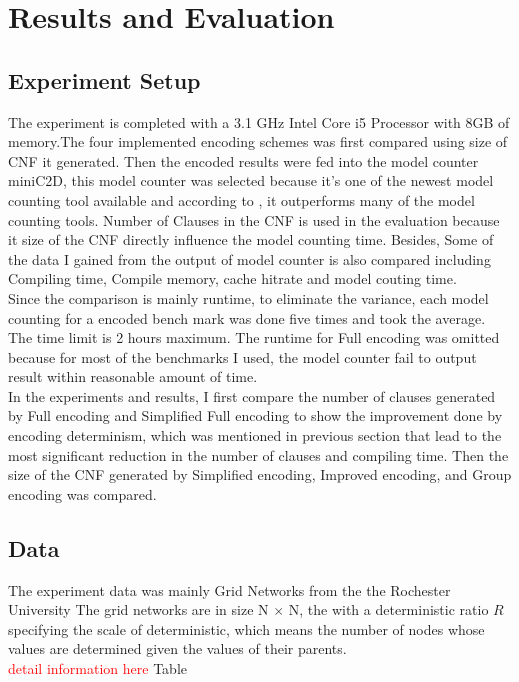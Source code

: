 \newpage
\section{Results and Evaluation}
\subsection{Experiment Setup}
The experiment is completed with a 3.1 GHz Intel Core i5 Processor with 8GB of memory.The four implemented encoding schemes was first compared using size of CNF it generated. Then the encoded results were fed into the model counter miniC2D, this model counter was selected because it's one of the newest model counting tool available and according to \cite{minic2d}, it outperforms many of the model counting tools. Number of Clauses in the CNF is used in the evaluation because it size of the CNF directly influence the model counting time. Besides, Some of the data I gained from the output of model counter is also compared including Compiling time, Compile memory, cache hitrate and model couting time.\\

Since the comparison is mainly runtime, to eliminate the variance, each model counting for a encoded bench mark was done five times and took the average. The time limit is 2 hours maximum. The runtime for Full encoding was omitted because for most of the benchmarks I used, the model counter fail to output result within reasonable amount of time.\\

In the experiments and results, I first compare the number of clauses generated by Full encoding and Simplified Full encoding to show the improvement done by encoding determinism, which was mentioned in previous section that lead to the most significant reduction in the number of clauses and compiling time. Then the size of the CNF generated by Simplified encoding, Improved encoding, and Group encoding was compared.\\


\subsection{Data}
The experiment data was mainly Grid Networks from the the Rochester University The grid networks are in size N $\times$ N, the with a deterministic ratio $R$ specifying the scale of deterministic, which means the number of nodes whose values are determined given the values of their parents. \\
\textcolor{red}{detail information here}
Table 

